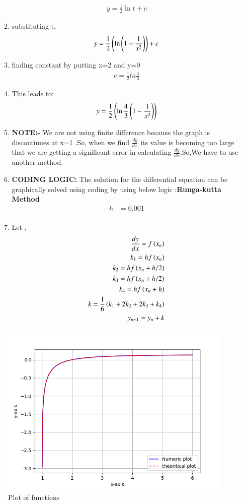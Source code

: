 \documentclass[journal]{IEEEtran}
\begin{document}
\begin{enumerate}
\begin{enumerate}
\begin{align}
    y = \frac{1}{2}\ln{t} + c
    \end{align}
    \item substituting t,
    \begin{align}
    y = \frac{1}{2}\left(\ln{\ensuremath{\left(1-\frac{1}{x^2}\right)}}\right) + c
    \end{align} 
    \item finding constant by putting x=2 and y=0
    \begin{align}
    c = \frac{1}{2}ln{\frac{4}{3}}
    \end{align} 
    \item This leads to:
    \begin{align}
    y = \frac{1}{2}\left(\ln{\frac{4}{3}\ensuremath{\left(1-\frac{1}{x^2}\right)}}\right)
    \end{align}
    \item \textbf{NOTE:-} We are not using finite difference because the graph is discontinues at x=1 .So, when we find $\frac{dy}{dx}$ its value is becoming too large that we are getting a significant error in calculating $\frac{dy}{dx}$.So,We have to use another method.
    \item \textbf{CODING LOGIC:} The solution for the differential equation can be graphically solved using coding by using below logic :\textbf{Runga-kutta Method}
\begin{align} 
	h&=0.001 \\
\end{align}
\item Let ,
\begin{align} 
	\frac{dy}{dx} = f\left(x_n\right) \\
	k_1 = hf\left(x_n\right)\\
	k_2 = hf\left(x_n + h/2\right)\\
	k_3 = hf\left(x_n + h/2\right)\\
	k_4 = hf\left(x_n + h\right)\\
	k = \frac{1}{6}\left(k_1 + 2k_2 + 2k_3+k_4\right)\\
	y_{n+1} = y_n + k
\end{align}
\end{enumerate}

\end{enumerate}

\begin{figure}[h!]
   \centering
   \includegraphics[width=0.7\linewidth]{figs/Figure_1.png}
   \caption{Plot of functions}
\end{figure}
\end{document}
